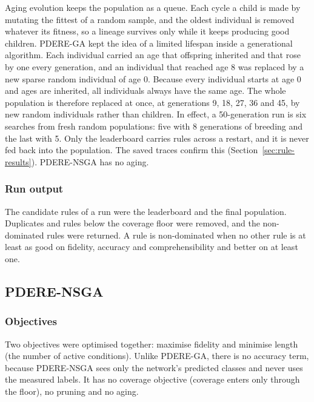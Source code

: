 Aging evolution \citep{real2019} keeps the population as a queue. Each cycle a child is made by mutating the fittest of a random sample, and the oldest individual is removed whatever its fitness, so a lineage survives only while it keeps producing good children. PDERE-GA kept the idea of a limited lifespan inside a generational algorithm. Each individual carried an age that offspring inherited and that rose by one every generation, and an individual that reached age 8 was replaced by a new sparse random individual of age 0. Because every individual starts at age 0 and ages are inherited, all individuals always have the same age. The whole population is therefore replaced at once, at generations 9, 18, 27, 36 and 45, by new random individuals rather than children. In effect, a 50-generation run is six searches from fresh random populations: five with 8 generations of breeding and the last with 5. Only the leaderboard carries rules across a restart, and it is never fed back into the population. The saved traces confirm this (Section~\ref{sec:rule-results}). PDERE-NSGA has no aging.

\subsubsection{Run output}
\label{sec:run-output-ga}

The candidate rules of a run were the leaderboard and the final population. Duplicates and rules below the coverage floor were removed, and the non-dominated rules were returned. A rule is non-dominated when no other rule is at least as good on fidelity, accuracy and comprehensibility and better on at least one.

\subsection{PDERE-NSGA}
\label{sec:pdere-nsga}

\subsubsection{Objectives}
\label{sec:objectives}

Two objectives were optimised together: maximise fidelity and minimise length (the number of active conditions). Unlike PDERE-GA, there is no accuracy term, because PDERE-NSGA sees only the network's predicted classes and never uses the measured labels. It has no coverage objective (coverage enters only through the floor), no pruning and no aging.

